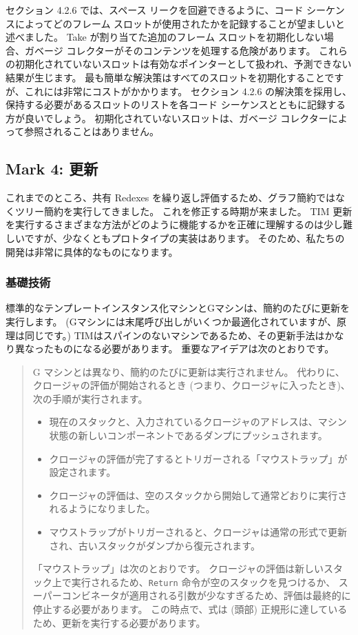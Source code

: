 \documentclass{jarticle}
\begin{document}
セクション 4.2.6 では、スペース リークを回避できるように、コード シーケンスによってどのフレーム スロットが使用されたかを記録することが望ましいと述べました。
Take が割り当てた追加のフレーム スロットを初期化しない場合、ガベージ コレクターがそのコンテンツを処理する危険があります。
これらの初期化されていないスロットは有効なポインターとして扱われ、予測できない結果が生じます。
最も簡単な解決策はすべてのスロットを初期化することですが、これには非常にコストがかかります。
セクション 4.2.6 の解決策を採用し、保持する必要があるスロットのリストを各コード シーケンスとともに記録する方が良いでしょう。
初期化されていないスロットは、ガベージ コレクターによって参照されることはありません。

\newpage

\subsection{Mark 4: 更新}

これまでのところ、共有 Redexes を繰り返し評価するため、グラフ簡約ではなくツリー簡約を実行してきました。
これを修正する時期が来ました。
TIM 更新を実行するさまざまな方法がどのように機能するかを正確に理解するのは少し難しいですが、少なくともプロトタイプの実装はあります。
そのため、私たちの開発は非常に具体的なものになります。

\subsubsection{基礎技術}

標準的なテンプレートインスタンス化マシンとGマシンは、簡約のたびに更新を実行します。
(Gマシンには末尾呼び出しがいくつか最適化されていますが、原理は同じです。)
TIMはスパインのないマシンであるため、その更新手法はかなり異なったものになる必要があります。
重要なアイデアは次のとおりです。

\begin{quote}
	G マシンとは異なり、簡約のたびに更新は実行されません。
	代わりに、クロージャの評価が開始されるとき (つまり、クロージャに入ったとき)、次の手順が実行されます。

	\begin{itemize}
		\item 現在のスタックと、入力されているクロージャのアドレスは、マシン状態の新しいコンポーネントであるダンプにプッシュされます。
		\item クロージャの評価が完了するとトリガーされる「マウストラップ」が設定されます。
		\item クロージャの評価は、空のスタックから開始して通常どおりに実行されるようになりました。
		\item マウストラップがトリガーされると、クロージャは通常の形式で更新され、古いスタックがダンプから復元されます。
	\end{itemize}

	「マウストラップ」は次のとおりです。
	クロージャの評価は新しいスタック上で実行されるため、\texttt{Return} 命令が空のスタックを見つけるか、
	スーパーコンビネータが適用される引数が少なすぎるため、評価は最終的に停止する必要があります。
	この時点で、式は (頭部) 正規形に達しているため、更新を実行する必要があります。
\end{quote}
\end{document}
